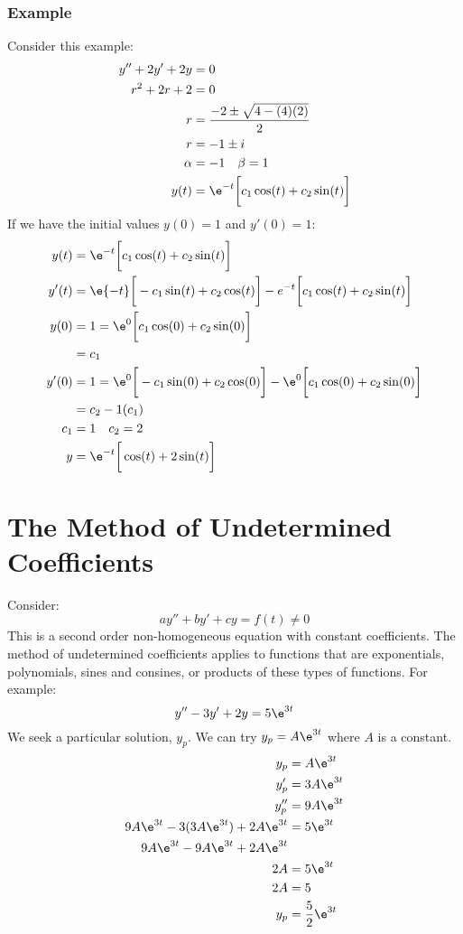 \documentclass{math}
\begin{document}
\subsubsection*{Example}
Consider this example:
\begin{align*}
  y''+2y'+2y &= 0 \\
  r^2+2r+2 &= 0 \\
  r &= \frac{-2\pm\sqrt{4-(4)(2)}}{2} \\
  r &= -1\pm i \\
  \alpha &= -1 \quad \beta = 1 \\
  y(t) &= \e^{-t}\bigg[c_1\cos(t)+c_2\sin(t)\bigg]
\end{align*}
If we have the initial values \( y(0) = 1 \) and \( y'(0) = 1 \):
\begin{align*}
  y(t) &= \e^{-t}\bigg[c_1\cos(t)+c_2\sin(t)\bigg] \\
  y'(t) &= \e{-t}\bigg[-c_1\sin(t)+c_2\cos(t)\bigg]-
    e^{-t}\bigg[c_1\cos(t)+c_2\sin(t)\bigg] \\
  y(0) &= 1 = \e^{0}\bigg[c_1\cos(0)+c_2\sin(0)\bigg] \\
  &= c_1 \\
  y'(0) &= 1 = \e^{0}\bigg[-c_1\sin(0)+c_2\cos(0)\bigg]-
    \e^{0}\bigg[c_1\cos(0)+c_2\sin(0)\bigg] \\
  &= c_2-1(c_1) \\
  c_1 &= 1 \quad c_2 = 2 \\
  y &= \e^{-t}\bigg[\cos(t)+2\sin(t)\bigg]
\end{align*}

\section*{The Method of Undetermined Coefficients}
Consider:
\[ ay''+by'+cy = f(t) \ne 0 \]
This is a second order non-homogeneous equation with constant coefficients. The
method of undetermined coefficients applies to functions that are exponentials,
polynomials, sines and consines, or products of these types of functions. For
example:
\[ y''-3y'+2y = 5\e^{3t} \]
We seek a particular solution, \( y_p \). We can try \( y_p = A\e^{3t} \) where
\( A \) is a constant.
\begin{align*}
  y_p &= A\e^{3t} \\
  y_p' &= 3A\e^{3t} \\
  y_p'' &= 9A\e^{3t} \\
  9A\e^{3t}-3(3A\e^{3t})+2A\e^{3t} &= 5\e^{3t} \\
  9A\e^{3t}-9A\e^{3t}+2A\e^{3t} \\
  2A &= 5\e^{3t} \\
  2A &= 5 \\
  y_p &= \frac{5}{2}\e^{3t}
\end{align*}
\end{document}
